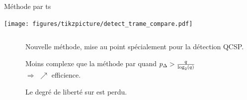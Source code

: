 \documentclass[../main.tex]{subfiles}
\begin{document}
\begin{frame}{Méthode par \acrfull{ts}}{}
  {%
    \centering
    \texttt{[image: figures/tikzpicture/detect\_trame\_compare.pdf]}
    \par%
  }%
  \begin{columns}
    \begin{column}{.45\linewidth}
      \begin{overlayarea}{\linewidth}{.5\textheight}
      \end{overlayarea}
    \end{column}
    \begin{column}{.55\linewidth}
      Nouvelle méthode, mise au point spécialement pour la détection QCSP.
      \begin{ctrlitemize}{0pt}
        \item [\bonus] Moins complexe que la méthode par \fft{} quand \textcolor{red}{$p_\Delta{} > \frac{q}{\log_2(q)}$} \cite{moniereTimeSlidingWindow2021}\\$\Rightarrow$ $\nearrow$ efficience.
        \item [\malus] Le degré de liberté sur \textcolor{red}{\pd{}} est perdu.
      \end{ctrlitemize}
    \end{column}
  \end{columns}
\end{frame}
\end{document}
